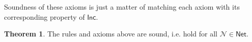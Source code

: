 \documentclass[letterpaper]{article}
\theoremstyle{definition}
\newtheorem{theorem}{Theorem}
\newtheorem{lemma}[theorem]{Lemma}
\newcommand{\semantics}[1]{[\![\mbox{\em $ #1 $\/}]\!]}
\newcommand{\Typ}{\textrm{\textup{\textbf{T}}}}
\newcommand{\Inc}{\textsf{Inc}}
\newcommand{\AllNets}{\mathsf{Net}}
\newcommand{\Net}{\mathcal{N}}
\begin{document}


Soundness of these axioms is just a matter of matching each axiom with its corresponding property of $\Inc$.

\begin{theorem}
The rules and axioms above are sound, i.e. hold for all $\Net \in \AllNets$.
\end{theorem}



\end{document}
